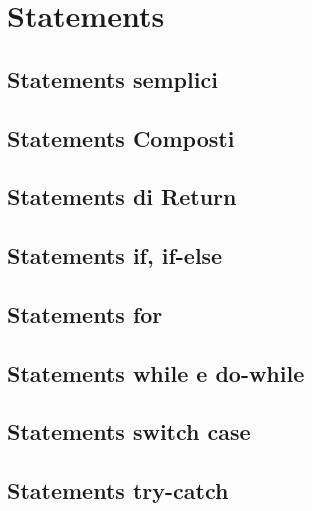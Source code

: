 \documentclass[11pt,titlepage,a4paper]{report}
\begin{document}
\section{Statements}
\subsection{Statements semplici}
\subsection{Statements Composti}
\subsection{Statements di Return}
\subsection{Statements if, if-else}
\subsection{Statements for}
\subsection{Statements while e do-while}
\subsection{Statements switch case}
\subsection{Statements try-catch}
\end{document}
